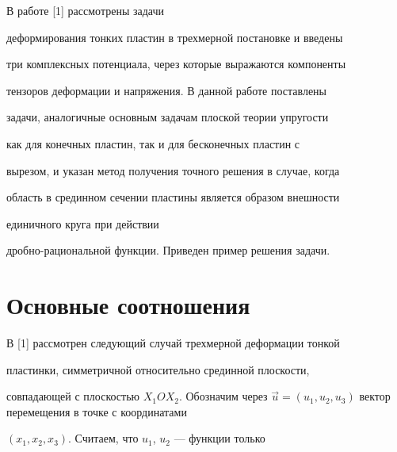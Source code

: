 \date{}




\pagestyle{plain} %







\maketitle


\label{begin}





В работе [1] рассмотрены задачи


деформирования тонких пластин в трехмерной постановке и введены


три комплексных потенциала,  через которые выражаются компоненты


тензоров деформации и напряжения. В данной работе поставлены


задачи, аналогичные основным задачам  плоской  теории  упругости


как для конечных пластин, так и для бесконечных пластин с


вырезом, и указан метод получения точного решения в  случае, когда


область в срединном сечении пластины является  образом внешности


единичного круга при действии


дробно-рациональной функции. Приведен пример решения задачи.








\section{Основные соотношения}





В [1] рассмотрен следующий случай трехмерной деформации тонкой


пластинки, симметричной относительно срединной плоскости,


совпадающей с плоскостью $X_1OX_2$. Обозначим через $\Vec{u} =


(u_1,u_2,u_3)$ вектор перемещения в точке с координатами


$(x_1,x_2,x_3)$. Считаем, что $u_1$, $u_2$ --- функции только


